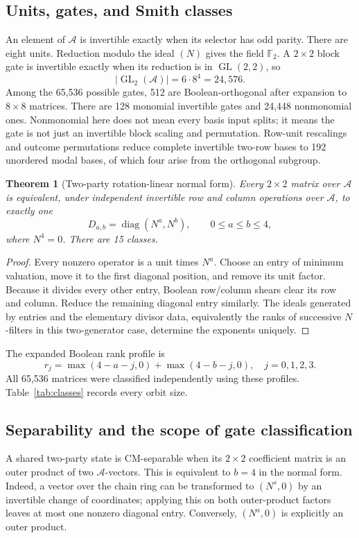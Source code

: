 \documentclass[11pt,a4paper]{article}
\newtheorem{theorem}{Theorem}[section]
\theoremstyle{definition}\newtheorem{definition}[theorem]{Definition}
\newcommand{\F}{\mathbb F_2}
\newcommand{\A}{\mathcal A}
\newcommand{\GL}{\operatorname{GL}}
\begin{document}
\subsection{Units, gates, and Smith classes}
An element of $\A$ is invertible exactly when its selector has odd parity. There are eight units. Reduction modulo the ideal $(N)$ gives the field $\F$. A $2\times2$ block gate is invertible exactly when its reduction is in $\GL(2,2)$, so
\[
 |\GL_2(\A)|=6\cdot8^4=24,576.
\]
Among the 65,536 possible gates, 512 are Boolean-orthogonal after expansion to $8\times8$ matrices. There are 128 monomial invertible gates and 24,448 nonmonomial ones. Nonmonomial here does not mean every basis input splits; it means the gate is not just an invertible block scaling and permutation. Row-unit rescalings and outcome permutations reduce complete invertible two-row bases to 192 unordered modal bases, of which four arise from the orthogonal subgroup.

\begin{theorem}[Two-party rotation-linear normal form]
Every $2\times2$ matrix over $\A$ is equivalent, under independent invertible row and column operations over $\A$, to exactly one
\[
 D_{a,b}=\operatorname{diag}(N^a,N^b),\qquad 0\le a\le b\le4,
\]
where $N^4=0$. There are 15 classes.
\end{theorem}
\begin{proof}
Every nonzero operator is a unit times $N^a$. Choose an entry of minimum valuation, move it to the first diagonal position, and remove its unit factor. Because it divides every other entry, Boolean row/column shears clear its row and column. Reduce the remaining diagonal entry similarly. The ideals generated by entries and the elementary divisor data, equivalently the ranks of successive $N$-filters in this two-generator case, determine the exponents uniquely.
\end{proof}
The expanded Boolean rank profile is
\begin{equation}
 r_j=\max(4-a-j,0)+\max(4-b-j,0),\quad j=0,1,2,3.
 \label{eq:profile}
\end{equation}
All 65,536 matrices were classified independently using these profiles. Table~\ref{tab:classes} records every orbit size.

\subsection{Separability and the scope of gate classification}
A shared two-party state is CM-separable when its $2\times2$ coefficient matrix is an outer product of two $\A$-vectors. This is equivalent to $b=4$ in the normal form. Indeed, a vector over the chain ring can be transformed to $(N^s,0)$ by an invertible change of coordinates; applying this on both outer-product factors leaves at most one nonzero diagonal entry. Conversely, $(N^a,0)$ is explicitly an outer product.
\end{document}
